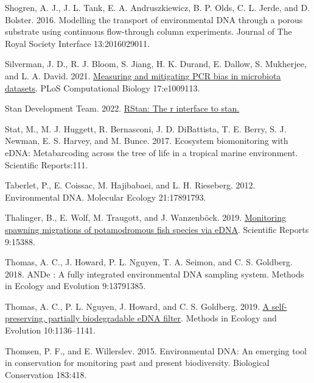 \documentclass[
]{article}
\newlength{\cslhangindent}
\newlength{\cslentryspacingunit} %
\newenvironment{CSLReferences}[2] %
 {%
  \setlength{\parindent}{0pt}
  \ifodd #1
  \let\oldpar\par
  \def\par{\hangindent=\cslhangindent\oldpar}
  \fi
  \setlength{\parskip}{#2\cslentryspacingunit}
 }%
 {}
\begin{document}
\begin{CSLReferences}{1}{0}
\leavevmode{}%
Shogren, A. J., J. L. Tank, E. A. Andruszkiewicz, B. P. Olds, C. L.
Jerde, and D. Bolster. 2016. Modelling the transport of environmental
DNA through a porous substrate using continuous flow-through column
experiments. Journal of The Royal Society Interface 13:2016029011.

\leavevmode{}%
Silverman, J. D., R. J. Bloom, S. Jiang, H. K. Durand, E. Dallow, S.
Mukherjee, and L. A. David. 2021.
\href{https://doi.org/10.1371/journal.pcbi.1009113}{Measuring and
mitigating PCR bias in microbiota datasets}. PLoS Computational Biology
17:e1009113.

\leavevmode{}%
Stan Development Team. 2022. \href{https://mc-stan.org/}{RStan: The r
interface to stan.}

\leavevmode{}%
Stat, M., M. J. Huggett, R. Bernasconi, J. D. DiBattista, T. E. Berry,
S. J. Newman, E. S. Harvey, and M. Bunce. 2017. Ecosystem biomonitoring
with eDNA: Metabarcoding across the tree of life in a tropical marine
environment. Scientific Reports:111.

\leavevmode{}%
Taberlet, P., E. Coissac, M. Hajibabaei, and L. H. Rieseberg. 2012.
Environmental DNA. Molecular Ecology 21:17891793.

\leavevmode{}%
Thalinger, B., E. Wolf, M. Traugott, and J. Wanzenböck. 2019.
\href{https://doi.org/10.1038/s41598-019-51398-0}{Monitoring spawning
migrations of potamodromous fish species via eDNA}. Scientific Reports
9:15388.

\leavevmode{}%
Thomas, A. C., J. Howard, P. L. Nguyen, T. A. Seimon, and C. S.
Goldberg. 2018. ANDe {\texttrademark}: A fully integrated environmental
DNA sampling system. Methods in Ecology and Evolution 9:13791385.

\leavevmode{}%
Thomas, A. C., P. L. Nguyen, J. Howard, and C. S. Goldberg. 2019.
\href{https://doi.org/10.1111/2041-210X.13212}{A self-preserving,
partially biodegradable eDNA filter}. Methods in Ecology and Evolution
10:1136--1141.

\leavevmode{}%
Thomsen, P. F., and E. Willerslev. 2015. Environmental DNA: An emerging
tool in conservation for monitoring past and present biodiversity.
Biological Conservation 183:418.


\end{CSLReferences}
\end{document}
